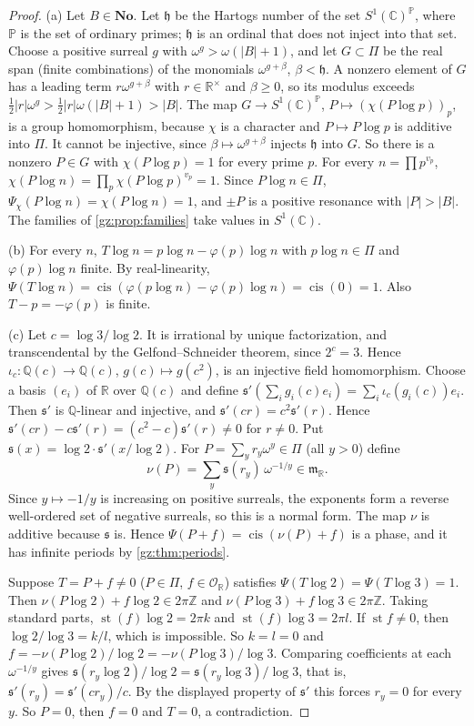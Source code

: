 \documentclass[11pt,a4paper]{article}
\numberwithin{equation}{section}
\theoremstyle{definition}
\theoremstyle{remark}
\newcommand{\No}{\mathbf{No}}
\newcommand{\R}{\mathbb R}
\newcommand{\C}{\mathbb C}
\newcommand{\Q}{\mathbb Q}
\newcommand{\Z}{\mathbb Z}
\newcommand{\OO}{\mathcal O}
\newcommand{\mm}{\mathfrak m}
\newcommand{\st}{\operatorname{st}}
\newcommand{\cis}{\operatorname{cis}}
\begin{document}
\begin{proof}
(a) Let $B\in\No$. Let $\mathfrak h$ be the Hartogs number of the set
$S^1(\C)^{\mathbb P}$, where $\mathbb P$ is the set of ordinary primes;
$\mathfrak h$ is an ordinal that does not inject into that set. Choose a
positive surreal $g$ with $\omega^g>\omega(|B|+1)$, and let $G\subset\Pi$
be the real span (finite combinations) of the monomials
$\omega^{g+\beta}$, $\beta<\mathfrak h$. A nonzero element of $G$ has a leading
term $r\omega^{g+\beta}$ with $r\in\R^\times$ and $\beta\ge0$, so its
modulus exceeds $\tfrac12|r|\omega^g>\tfrac12|r|\omega(|B|+1)>|B|$. The map $G\to S^1(\C)^{\mathbb P}$,
$P\mapsto(\chi(P\log p))_p$, is a group homomorphism, because $\chi$ is a
character and $P\mapsto P\log p$ is additive into $\Pi$. It cannot be
injective, since $\beta\mapsto\omega^{g+\beta}$ injects $\mathfrak h$ into $G$.
So there is a nonzero $P\in G$ with $\chi(P\log p)=1$ for every prime $p$.
For every $n=\prod p^{v_p}$, $\chi(P\log n)=\prod_p\chi(P\log p)^{v_p}=1$.
Since $P\log n\in\Pi$, $\Psi_\chi(P\log n)=\chi(P\log n)=1$, and $\pm P$ is
a positive resonance with $|P|>|B|$. The families of
\cref{gz:prop:families} take values in $S^1(\C)$.

(b) For every $n$, $T\log n=p\log n-\varphi(p)\log n$ with $p\log n\in\Pi$ and
$\varphi(p)\log n$ finite. By real-linearity,
$\Psi(T\log n)=\cis(\varphi(p\log n)-\varphi(p)\log n)=\cis(0)=1$. Also
$T-p=-\varphi(p)$ is finite.

(c) Let $c=\log3/\log2$. It is irrational by unique factorization, and
transcendental by the Gelfond--Schneider theorem, since $2^c=3$. Hence
$\iota_c:\Q(c)\to\Q(c)$, $g(c)\mapsto g(c^2)$, is an injective field
homomorphism. Choose a basis $(e_i)$ of $\R$ over $\Q(c)$ and define
$\mathfrak s'(\sum_ig_i(c)e_i)=\sum_i\iota_c(g_i(c))e_i$. Then $\mathfrak s'$ is
$\Q$-linear and injective, and $\mathfrak s'(cr)=c^2\mathfrak s'(r)$. Hence
$\mathfrak s'(cr)-c\mathfrak s'(r)=(c^2-c)\mathfrak s'(r)\ne0$ for $r\ne0$. Put
$\mathfrak s(x)=\log2\cdot\mathfrak s'(x/\log2)$. For $P=\sum_yr_y\omega^y\in\Pi$
(all $y>0$) define
\[
\nu(P)=\sum_y\mathfrak s(r_y)\,\omega^{-1/y}\in\mm_\R .
\]
Since $y\mapsto-1/y$ is increasing on positive surreals, the exponents form
a reverse well-ordered set of negative surreals, so this is a normal form.
The map $\nu$ is additive because $\mathfrak s$ is. Hence
$\Psi(P+f)=\cis(\nu(P)+f)$ is a phase, and it has infinite periods by
\cref{gz:thm:periods}.

Suppose $T=P+f\ne0$ ($P\in\Pi$, $f\in\OO_\R$) satisfies
$\Psi(T\log2)=\Psi(T\log3)=1$. Then $\nu(P\log2)+f\log2\in2\pi\Z$ and
$\nu(P\log3)+f\log3\in2\pi\Z$. Taking standard parts,
$\st(f)\log2=2\pi k$ and $\st(f)\log3=2\pi l$. If $\st f\ne0$, then
$\log2/\log3=k/l$, which is impossible. So $k=l=0$ and
$f=-\nu(P\log2)/\log2=-\nu(P\log3)/\log3$. Comparing coefficients at each
$\omega^{-1/y}$ gives $\mathfrak s(r_y\log2)/\log2=\mathfrak s(r_y\log3)/\log3$, that
is, $\mathfrak s'(r_y)=\mathfrak s'(cr_y)/c$. By the displayed property of $\mathfrak s'$
this forces $r_y=0$ for every $y$. So $P=0$, then $f=0$ and $T=0$, a
contradiction.
\end{proof}
\end{document}
